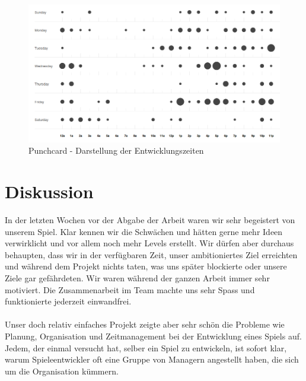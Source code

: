 \documentclass[11pt,a4paper]{scrbook}
\begin{document}
\begin{figure}[h]
\centering
\includegraphics[scale=0.4]{img/punchcard.png}
\caption{Punchcard - Darstellung der Entwicklungszeiten}
\label{fig:punchcard}
\end{figure}
 
\chapter{Diskussion}
In der letzten Wochen vor der Abgabe der Arbeit waren wir sehr begeistert von unserem Spiel. Klar kennen wir die Schwächen und hätten gerne mehr Ideen verwirklicht und vor allem noch mehr Levels erstellt. Wir dürfen aber durchaus behaupten, dass wir in der verfügbaren Zeit, unser ambitioniertes Ziel erreichten und während dem Projekt nichts taten, was uns später blockierte oder unsere Ziele gar gefährdeten. Wir waren während der ganzen Arbeit immer sehr motiviert. Die Zusammenarbeit im Team machte uns sehr Spass und funktionierte jederzeit einwandfrei.\\
\\
Unser doch relativ einfaches Projekt zeigte aber sehr schön die Probleme wie Planung, Organisation und
Zeitmanagement bei der Entwicklung eines Spiels auf. Jedem, der einmal versucht hat, selber ein Spiel
zu entwickeln, ist sofort klar, warum Spieleentwickler oft eine Gruppe von Managern angestellt haben, die sich
um die Organisation kümmern.
\end{document}
